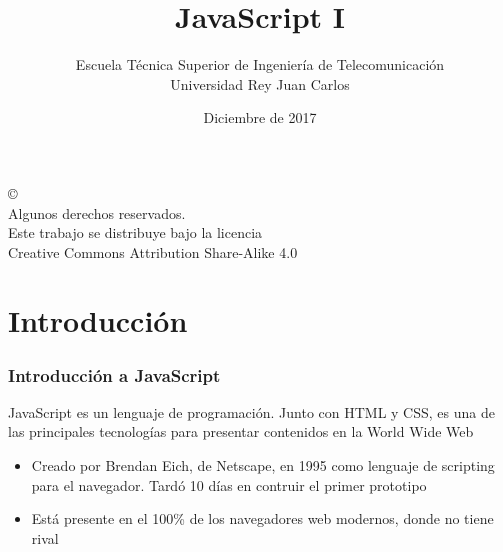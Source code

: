 \documentclass[ucs]{beamer}
\begin{document}
\title[JavaScript]{JavaScript I}
\author[GSyC]{Escuela Técnica Superior de Ingeniería de Telecomunicación\\
Universidad Rey Juan Carlos}
\date[2017]{Diciembre de 2017}

\begin{frame}
  \titlepage
\end{frame}


\begin{frame}[b]
\begin{flushright}
{\tiny
\copyright \insertshortdate~\insertshortauthor \\
  Algunos derechos reservados. \\
  Este trabajo se distribuye bajo la licencia \\
  Creative Commons Attribution Share-Alike 4.0
}
\end{flushright}
\end{frame}




%

\section{Introducción}



\begin{frame}
\frametitle{Introducción a JavaScript}

JavaScript es un lenguaje de programación. Junto con HTML y CSS, es una
de las principales tecnologías para presentar contenidos en la World Wide Web

\begin{itemize}
\item
Creado por Brendan Eich, de Netscape, en 1995 como lenguaje de scripting para el navegador. Tardó 10
días en contruir el primer prototipo

\item
Está presente en el 100\% de los navegadores web modernos, donde no tiene
rival
\end{itemize}

\end{frame}
\end{document}
